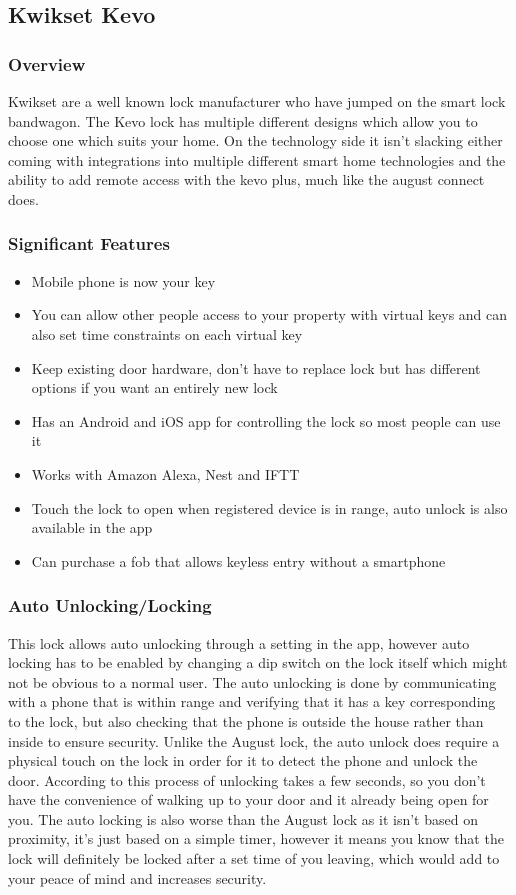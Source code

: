 \subsection{Kwikset Kevo}
\subsubsection{Overview}
Kwikset are a well known lock manufacturer who have jumped on the smart lock bandwagon. The Kevo lock has multiple different designs which allow you to choose one which suits your home. On the technology side it isn't slacking either coming with integrations into multiple different smart home technologies and the ability to add remote access with the kevo plus, much like the august connect does.

\subsubsection{Significant Features}
\begin{itemize}
	\item Mobile phone is now your key
	\item You can allow other people access to your property with virtual keys and can also set time constraints on each virtual key
	\item Keep existing door hardware, don't have to replace lock but has different options if you want an entirely new lock
	\item Has an Android and iOS app for controlling the lock so most people can use it
	\item Works with Amazon Alexa, Nest and IFTT
	\item Touch the lock to open when registered device is in range, auto unlock is also available in the app
	\item Can purchase a fob that allows keyless entry without a smartphone
\end{itemize}

\subsubsection{Auto Unlocking/Locking}
This lock allows auto unlocking through a setting in the app, however auto locking has to be enabled by changing a dip switch on the lock itself which might not be obvious to a normal user. The auto unlocking is done by communicating with a phone that is within range and verifying that it has a key corresponding to the lock, but also checking that the phone is outside the house rather than inside to ensure security. Unlike the August lock, the auto unlock does require a physical touch on the lock in order for it to detect the phone and unlock the door. According to \cite{DeLooper2018} this process of unlocking takes a few seconds, so you don't have the convenience of walking up to your door and it already being open for you. The auto locking is also worse than the August lock as it isn't based on proximity, it's just based on a simple timer, however it means you know that the lock will definitely be locked after a set time of you leaving, which would add to your peace of mind and increases security.

